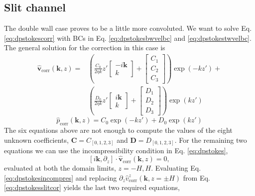 \documentclass[ twoside,openright,titlepage,numbers=noenddot,%
headinclude,footinclude,cleardoublepage=empty,abstract=on,
BCOR=5mm,paper=b5,fontsize=11pt, dvipsnames
]{scrreprt}
\renewcommand{\vec}[1]{\bm{#1}}
\newcommand{\fou}[1]{\widehat{#1}}
\newcommand{\fvel}{v}
\newcommand{\corr}{\text{corr}}
\begin{document}
\subsection*{Slit channel}
The double wall case proves to be a little more convoluted. We want to solve Eq. \eqref{eq:dpstokescorr} with \glspl{BC} in Eq. \eqref{eq:dpstokesbwvelbc} and \eqref{eq:dpstokestwvelbc}.
The general solution for the correction in this case is
\begin{equation}
  \label{eq:dpstokesslitcor}
  \begin{aligned}
    \fou{\vec{\fvel}}_{\corr}(\vec{k}, z) =& \left(\frac{C_0}{2\eta k} z'
      \begin{bmatrix}
        -i\vec{k}\\
        k
      \end{bmatrix}
      +
      \begin{bmatrix}
        C_1\\
        C_2\\
        C_3
      \end{bmatrix}
    \right)
    \exp(-kz')+\\    
    &\left(\frac{D_0}{2\eta k} z'
      \begin{bmatrix}
        i\vec{k}\\
        k
      \end{bmatrix}
      +
      \begin{bmatrix}
        D_1\\
        D_2\\
        D_3
      \end{bmatrix}
    \right)\exp(kz')
  \end{aligned}
\end{equation}
\begin{equation}
  \fou{p}_{\corr}(\vec{k}, z) = C_0\exp(-k z') + D_0\exp(k z')
\end{equation}
The six equations above are not enough to compute the values of the eight unknown coefficients, $\vec{C}=C_{[0,1,2,3]}$ and $\vec{D} = D_{[0,1,2,3]}$. For the remaining two equations we can use the incompressibility condition in Eq. \eqref{eq:dpstokes},
\begin{equation}
  \label{eq:dpstokesincompres}
  [i\vec{k}, \partial_z] \cdot\fou{\vec{\fvel}}_{\corr}(\vec{k}, z) = 0,
\end{equation}
evaluated at both the domain limits, $z=-H,H$.
Evaluating Eq. \eqref{eq:dpstokesincompres} and replacing $\partial_z\fou{\fvel}_{\corr}^z(\vec{k}, z=\pm H)$ from Eq. \eqref{eq:dpstokesslitcor} yields the last two required equations,
\end{document}
